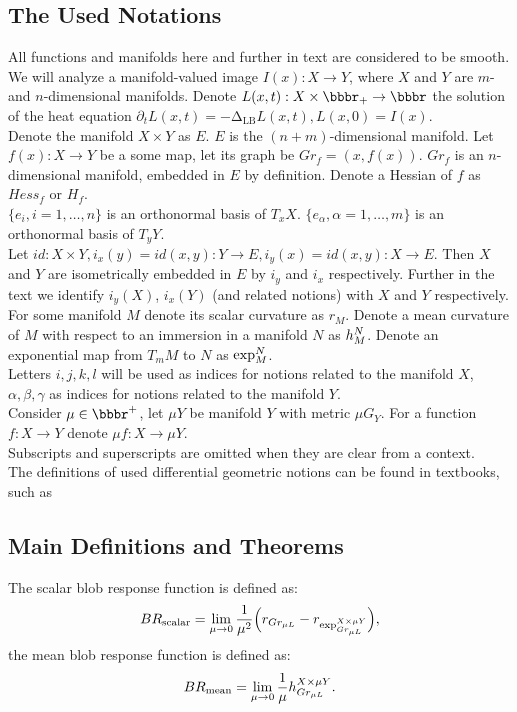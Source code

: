 \documentclass{llncs}
\newcommand{\LaplaceBeltrami}{\mathrm{\Delta_{{LB}}}}
\newcommand{\partderiv}[2]{\partial_{#2} {#1}}
\newcommand{\toreal}{\rightarrow\bbbr}
\newcommand{\TangentSpaceArg}[2]{{T_{#2}}{#1}}
\newcommand{\FRScalar}{BR_{\mathrm{scalar}}}
\newcommand{\FRMean}{BR_{\mathrm{mean}}}
\begin{document}
\subsection{The Used Notations}
All functions and manifolds here and further in text are considered to be smooth. 
\\ 
We will analyze a manifold-valued image $I(x):X \to Y$, where $X$ and $Y$ are $m$- and $n$-dimensional manifolds. Denote $L(x,t):X\times \bbbr_{+} \toreal$ the solution of the heat equation $\partderiv{L(x, t)}{t}=-\LaplaceBeltrami{ L(x, t)},L(x, 0)=I(x)$. 
\\
Denote the manifold $X\times Y$ as $E$. $E$ is the $(n+m)$-dimensional manifold. Let $f(x):X\to Y$ be a some map, let its graph be $Gr_f=(x,f(x))$. $Gr_f$ is an $n$-dimensional manifold, embedded in $E$ by definition. Denote a Hessian of $f$ as $Hess_f$ or $H_f$.
\\
$\{e_i, i=1,\dots,n\}$ is an orthonormal basis of $T_x X$. $\{e_\alpha, \alpha=1,\dots,m\}$ is an orthonormal basis of $T_y Y$.
\\
Let $id:X\times Y, i_x(y)=id(x, y):Y\to E, i_y(x)=id(x, y):X\to E$. Then $X$ and $Y$ are isometrically embedded in $E$ by $i_y$ and $i_x$ respectively. Further in the text we identify $i_y(X)$, $i_x(Y)$ (and related notions) with $X$ and $Y$ respectively.
\\
For some manifold $M$ denote its scalar curvature as $r_M$. Denote a mean curvature of $M$ with respect to an immersion in a manifold $N$ as $\tensor*{h}{^{N}_{M}}$. Denote an exponential map from $\TangentSpaceArg{M}{m}$ to $N$ as $\tensor*{\exp}{^N_{M}}$.
\\
Letters $i,j,k,l$ will be used as indices for notions related to the manifold $X$, $\alpha, \beta, \gamma$ as indices for notions related to the manifold $Y$.
\\
Consider $\mu \in \bbbr^{+}$, let $\mu Y$ be manifold $Y$ with metric $\mu G_Y$. For a function $f:X\to Y$ denote $\mu f:X\to \mu Y$.
\\
Subscripts and superscripts are omitted when they are clear from a context.
\\The definitions of used differential geometric notions can be found in textbooks, such as \cite{DiffGeom}
\subsection{Main Definitions and Theorems}

\begin{definition} \label{RiemanDef}
The scalar blob response function is defined as:
\begin{equation*}\FRScalar=\lim_{\mu\to 0} \frac{1}{\mu ^ 2} \Big( r_{Gr_{\mu L}} - r_{\tensor*{\exp}{^{X\times\mu Y}_{Gr_{\mu L}}}} \Big),\end{equation*}
the mean blob response function is defined as:
\begin{equation*}\FRMean=\lim_{\mu\to 0} \frac{1}{\mu } \tensor*{h}{^{X\times\mu Y}_{Gr_{\mu L}}}.\end{equation*}
\end{definition}
\end{document}
